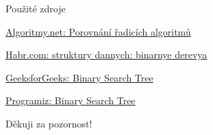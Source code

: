 \documentclass[10pt]{beamer}
\begin{document}
\begin{frame}{Použité zdroje}
    \begin{thebibliography}{9}
         \href{https://www.algoritmy.net/article/75/Porovnani-algoritmu}{Algoritmy.net: Porovnání řadicích algoritmů}
        
        \href{https://habr.com/ru/post/65617/}{Habr.com: struktury dannych: binarnye derevya}
        
        \href{https://www.geeksforgeeks.org/binary-search-tree-data-structure/}{GeeksforGeeks: Binary Search Tree}
        
        \href{https://www.programiz.com/dsa/binary-search-tree}{Programiz: Binary Search Tree}
\end{thebibliography}
\end{frame}

\begin{frame}[standout]
    \huge Děkuji za pozornost!
\end{frame}
\end{document}
